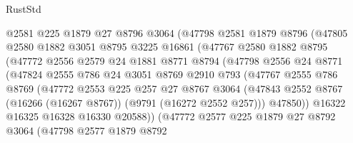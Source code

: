 \begin{lexlean}{RustStd}
\begin{coremodule}
                    @2581
                    @225
                    @1879
                    @27
                    @8796
                    @3064
                    (@47798
                      @2581
                      @1879
                      @8796
                      (@47805
                        @2580
                        @1882
                        @3051
                        @8795
                        @3225
                        @16861
                        (@47767
                          @2580
                          @1882
                          @8795
                          (@47772
                            @2556
                            @2579
                            @24
                            @1881
                            @8771
                            @8794
                            (@47798
                              @2556
                              @24
                              @8771
                              (@47824
                                @2555
                                @786
                                @24
                                @3051
                                @8769
                                @2910
                                @793
                                (@47767
                                  @2555
                                  @786
                                  @8769
                                  (@47772
                                    @2553
                                    @225
                                    @257
                                    @27
                                    @8767
                                    @3064
                                    (@47843
                                      @2552
                                      @8767
                                      (@16266 (@16267 @8767))
                                      (@9791 (@16272 @2552 @257)))
                                    @47850))
                                @16322
                                @16325
                                @16328
                                @16330
                                @20588))
                            (@47772
                              @2577
                              @225
                              @1879
                              @27
                              @8792
                              @3064
                              (@47798
                                @2577
                                @1879
                                @8792

\end{coremodule}
\end{lexlean}
